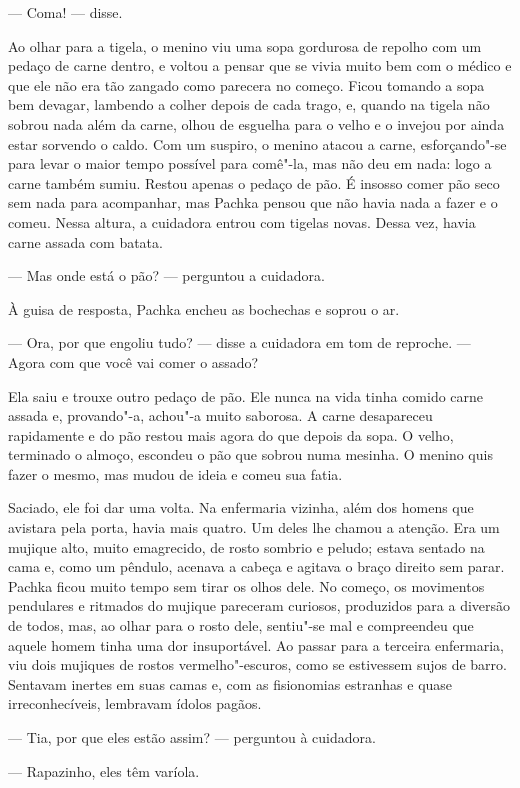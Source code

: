 --- Coma! --- disse.

Ao olhar para a tigela, o menino viu uma sopa gordurosa de repolho com um
pedaço de carne dentro, e voltou a pensar que se vivia muito bem com o
médico e que ele não era tão zangado como parecera no começo. Ficou
tomando a sopa bem devagar, lambendo a colher depois de cada trago, e,
quando na tigela não sobrou nada além da carne, olhou de esguelha para o
velho e o invejou por ainda estar sorvendo o caldo. Com um suspiro, o
menino atacou a carne, esforçando"-se para levar o maior tempo possível
para comê"-la, mas não deu em nada: logo a carne também sumiu. Restou
apenas o pedaço de pão. É insosso comer pão seco sem nada para
acompanhar, mas Pachka pensou que não havia nada a fazer e o comeu.
Nessa altura, a cuidadora entrou com tigelas novas. Dessa vez, havia carne assada com batata.

--- Mas onde está o pão? --- perguntou a cuidadora.

À guisa de resposta, Pachka encheu as bochechas e soprou o ar.

--- Ora, por que engoliu tudo? --- disse a cuidadora em tom de reproche.
--- Agora com que você vai comer o assado?

Ela saiu e trouxe outro pedaço de pão. Ele nunca na vida tinha comido
carne assada e, provando"-a, achou"-a muito saborosa. A carne desapareceu
rapidamente e do pão restou mais agora do que depois da sopa. O velho,
terminado o almoço, escondeu o pão que sobrou numa mesinha. O menino quis
fazer o mesmo, mas mudou de ideia e comeu sua fatia.

Saciado, ele foi dar uma volta. Na enfermaria vizinha, além dos homens
que avistara pela porta, havia mais quatro. Um deles lhe chamou a
atenção. Era um mujique alto, muito emagrecido, de rosto sombrio e
peludo; estava sentado na cama e, como um pêndulo, acenava a cabeça e
agitava o braço direito sem parar. Pachka ficou muito tempo sem tirar os
olhos dele. No começo, os movimentos pendulares e ritmados do mujique
pareceram curiosos, produzidos para a diversão de todos, mas, ao olhar
para o rosto dele, sentiu"-se mal e compreendeu que aquele homem
tinha uma dor insuportável. Ao passar para a terceira enfermaria, viu
dois mujiques de rostos vermelho"-escuros, como se estivessem sujos de
barro. Sentavam inertes em suas camas e, com as fisionomias estranhas e
quase irreconhecíveis, lembravam ídolos pagãos.

--- Tia, por que eles estão assim? --- perguntou à cuidadora.

--- Rapazinho, eles têm varíola.

